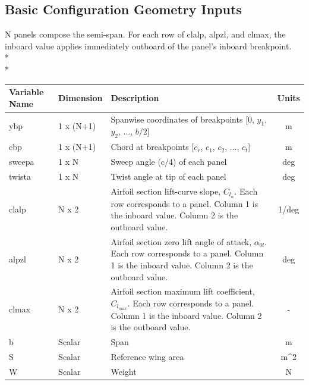 \documentclass{article}
\begin{document}
\subsection{Basic Configuration Geometry Inputs}
N panels compose the semi-span.  For each row of clalp, alpzl, and
clmax, the inboard value applies immediately outboard of the panel's
inboard breakpoint.\\*\\*
\begin{tabular}{|l|l|p{2.5in}|c|}
  \hline
  \textbf{Variable Name} &
  \textbf{Dimension} &
  \textbf{Description} &
  \textbf{Units}
  \\
  \hline
  ybp & 1 x (N+1) &
  Spanwise coordinates of breakpoints [$0$, $y_1$, $y_2$, ..., $b/2$] &
  m
  \\
  \hline
  cbp & 1 x (N+1) &
  Chord at breakpoints [$c_r$, $c_1$, $c_2$, ..., $c_t$] &
  m
  \\
  \hline
  sweepa & 1 x N &
  Sweep angle (c/4) of each panel &
  deg
  \\
  \hline
  twista & 1 x N &
  Twist angle at tip of each panel &
  deg
  \\
  \hline
  clalp & N x 2 &
  Airfoil section lift-curve slope, $C_{l_\alpha}$.  Each row
  corresponds to a panel.  Column 1 is the inboard value.  Column 2 is
  the outboard value. &
  1/deg
  \\
  \hline
  alpzl & N x 2 &
  Airfoil section zero lift angle of attack, $\alpha_{0l}$.  Each row
  corresponds to a panel.  Column 1 is the inboard value.  Column 2 is
  the outboard value. &
  deg
  \\
  \hline
  clmax & N x 2 &
  Airfoil section maximum lift coefficient, $C_{l_{max}}$.  Each row
  corresponds to a panel.  Column 1 is the inboard value.  Column 2 is
  the outboard value. &
  -
  \\
  \hline
  b & Scalar &
  Span &
  m
  \\
  \hline
  S & Scalar &
  Reference wing area &
  m\^{}2
  \\
  \hline
  W & Scalar &
  Weight &
  N
  \\
  \hline
\end{tabular}
\end{document}
